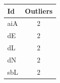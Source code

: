 \begin{tabular}{lc}
\toprule
Id & Outliers \\
\midrule
aiA & 2 \\
dE & 2 \\
dL & 2 \\
dN & 2 \\
sbL & 2 \\
\bottomrule
\end{tabular}
